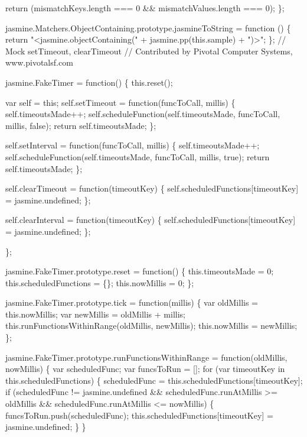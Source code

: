 \begin{DoxyCodeInclude}
  \textcolor{keywordflow}{return} (mismatchKeys.length === 0 && mismatchValues.length === 0);
\};

jasmine.Matchers.ObjectContaining.prototype.jasmineToString = \textcolor{keyword}{function} () \{
  \textcolor{keywordflow}{return} \textcolor{stringliteral}{"<jasmine.objectContaining("} + jasmine.pp(this.sample) + \textcolor{stringliteral}{")>"};
\};
\textcolor{comment}{// Mock setTimeout, clearTimeout}
\textcolor{comment}{// Contributed by Pivotal Computer Systems, www.pivotalsf.com}

jasmine.FakeTimer = \textcolor{keyword}{function}() \{
  this.reset();

  var \textcolor{keyword}{self} = \textcolor{keyword}{this};
  \textcolor{keyword}{self}.setTimeout = \textcolor{keyword}{function}(funcToCall, millis) \{
    \textcolor{keyword}{self}.timeoutsMade++;
    \textcolor{keyword}{self}.scheduleFunction(\textcolor{keyword}{self}.timeoutsMade, funcToCall, millis, \textcolor{keyword}{false});
    \textcolor{keywordflow}{return} \textcolor{keyword}{self}.timeoutsMade;
  \};

  \textcolor{keyword}{self}.setInterval = \textcolor{keyword}{function}(funcToCall, millis) \{
    \textcolor{keyword}{self}.timeoutsMade++;
    \textcolor{keyword}{self}.scheduleFunction(\textcolor{keyword}{self}.timeoutsMade, funcToCall, millis, \textcolor{keyword}{true});
    \textcolor{keywordflow}{return} \textcolor{keyword}{self}.timeoutsMade;
  \};

  \textcolor{keyword}{self}.clearTimeout = \textcolor{keyword}{function}(timeoutKey) \{
    \textcolor{keyword}{self}.scheduledFunctions[timeoutKey] = jasmine.undefined;
  \};

  \textcolor{keyword}{self}.clearInterval = \textcolor{keyword}{function}(timeoutKey) \{
    \textcolor{keyword}{self}.scheduledFunctions[timeoutKey] = jasmine.undefined;
  \};

\};

jasmine.FakeTimer.prototype.reset = \textcolor{keyword}{function}() \{
  this.timeoutsMade = 0;
  this.scheduledFunctions = \{\};
  this.nowMillis = 0;
\};

jasmine.FakeTimer.prototype.tick = \textcolor{keyword}{function}(millis) \{
  var oldMillis = this.nowMillis;
  var newMillis = oldMillis + millis;
  this.runFunctionsWithinRange(oldMillis, newMillis);
  this.nowMillis = newMillis;
\};

jasmine.FakeTimer.prototype.runFunctionsWithinRange = \textcolor{keyword}{function}(oldMillis, nowMillis) \{
  var scheduledFunc;
  var funcsToRun = [];
  \textcolor{keywordflow}{for} (var timeoutKey in this.scheduledFunctions) \{
    scheduledFunc = this.scheduledFunctions[timeoutKey];
    \textcolor{keywordflow}{if} (scheduledFunc != jasmine.undefined &&
        scheduledFunc.runAtMillis >= oldMillis &&
        scheduledFunc.runAtMillis <= nowMillis) \{
      funcsToRun.push(scheduledFunc);
      this.scheduledFunctions[timeoutKey] = jasmine.undefined;
    \}
  \}


\end{DoxyCodeInclude}
